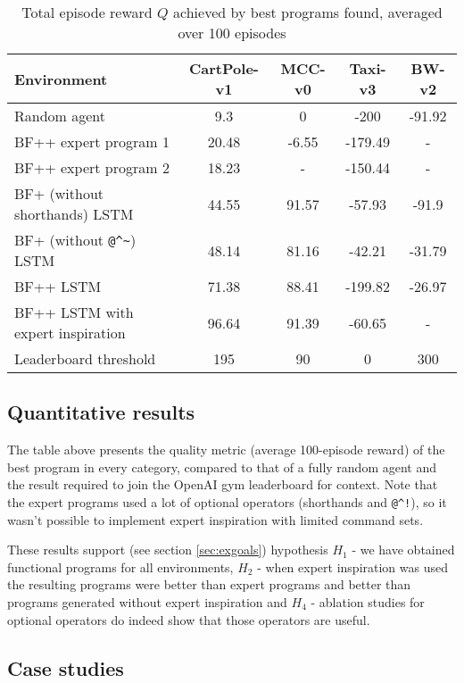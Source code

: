 \begin{table}[H]
  \caption{Total episode reward $Q$ achieved by best programs found, averaged over 100 episodes}
  \label{tab:quality}
  \centering
  \begin{tabular}{lcccc}
    Environment     & CartPole-v1     & MCC-v0 & Taxi-v3 & BW-v2 \\
    \midrule
    Random agent & 9.3 & 0 & -200 & -91.92  \\
    \midrule
    BF++ expert program 1 & 20.48 & -6.55 & -179.49 & - \\
    BF++ expert program 2 & 18.23 & - & -150.44 & - \\
    BF+ (without shorthands) LSTM & 44.55 & 91.57 & -57.93 & -91.9 \\
    BF+ (without \verb|@^~|) LSTM & 48.14 & 81.16 & -42.21 & -31.79 \\
    BF++ LSTM     & 71.38 & 88.41 & -199.82 & -26.97 \\
    BF++ LSTM with expert inspiration  & 96.64 & 91.39 & -60.65 & - \\
    \midrule
    Leaderboard threshold & 195 & 90 & 0 & 300 \\
    \bottomrule
  \end{tabular}
\end{table}

\subsection{Quantitative results}

The table above presents the quality metric (average 100-episode reward) of the best program in every category, compared to that of a fully random agent and the result required to join the OpenAI gym leaderboard for context.
Note that the expert programs used a lot of optional operators (shorthands and \verb|@^!|), so it wasn't possible to implement expert inspiration with limited command sets.

These results support (see section \ref{sec:exgoals}) hypothesis $H_1$ - we have obtained functional programs for all environments, $H_2$ - when expert inspiration was used the resulting programs were better than expert programs and better than programs generated without expert inspiration and $H_4$ - ablation studies for optional operators do indeed show that those operators are useful.

\subsection{Case studies}
\label{sec:casestudies}

